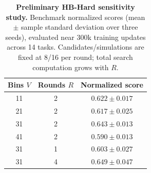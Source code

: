 \begin{table}[t]
\centering
\caption{\textbf{Preliminary HB-Hard sensitivity study.} Benchmark normalized scores (mean $\pm$ sample standard deviation over three seeds), evaluated near 300k training updates across 14 tasks. Candidates/simulations are fixed at 8/16 per round; total search computation grows with $R$.}
\label{tab:hb_hard_vr_sweep}
\begin{tabular}{ccc}
\toprule
Bins $V$ & Rounds $R$ & Normalized score \\
\midrule
11 & 2 & $0.622 \pm 0.017$ \\
21 & 2 & $0.617 \pm 0.025$ \\
31 & 2 & $0.643 \pm 0.013$ \\
41 & 2 & $0.590 \pm 0.013$ \\
\midrule
31 & 1 & $0.603 \pm 0.027$ \\
31 & 4 & $0.649 \pm 0.047$ \\
\bottomrule
\end{tabular}
\end{table}

\begin{table}[t]
\centering
\small
\caption{\textcolor{blue}{DMC humanoid performance under strict search budgets (mean $\pm$ sample standard deviation).}}
\label{tab:simulation_budget}
\end{table}

